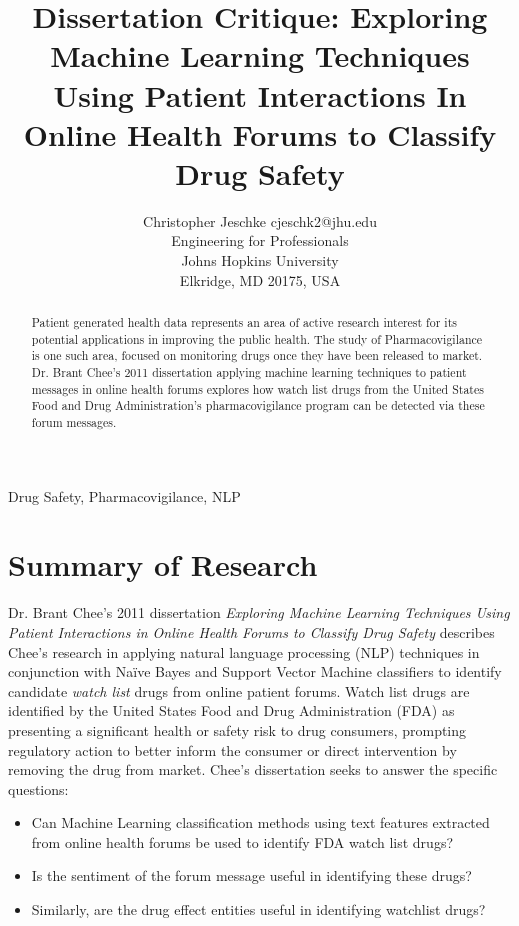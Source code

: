 \documentclass[twoside,11pt]{article}
\begin{document}
\title{Dissertation Critique: Exploring Machine Learning Techniques Using Patient
      Interactions In Online Health Forums to Classify Drug Safety}

\author{\name Christopher Jeschke \email cjeschk2@jhu.edu \\
       \addr Engineering for Professionals\\
       Johns Hopkins University\\
       Elkridge, MD 20175, USA}


\maketitle


\singlespacing

\begin{abstract}%
  Patient generated health data represents an area of active research interest
  for its potential applications in improving the public health. The study of
  Pharmacovigilance is one such area, focused on monitoring drugs once they have been released to market. Dr. Brant Chee's 2011 dissertation applying machine learning techniques to patient messages in online health forums explores how watch list drugs from the United States Food and Drug Administration's pharmacovigilance program can be detected via these forum messages.
\end{abstract}

\begin{keywords}
  Drug Safety, Pharmacovigilance, NLP
\end{keywords}

\section{Summary of Research}
Dr. Brant Chee's 2011 dissertation \textit{Exploring Machine Learning Techniques Using
Patient Interactions in Online Health Forums to Classify Drug Safety} describes
Chee's research in applying natural language processing (NLP) techniques in conjunction with Na\"ive Bayes and Support Vector Machine classifiers to identify candidate \textit{watch list} drugs from online patient forums. Watch list drugs are identified by the United States Food and Drug Administration (FDA) as presenting a significant health or safety risk to drug consumers, prompting regulatory action to better inform the consumer or direct intervention by removing the drug from market. Chee's dissertation seeks to answer the specific questions:
\begin{itemize}
  \item Can Machine Learning classification methods using text features extracted from online health forums be used to identify FDA watch list drugs?
  \item Is the sentiment of the forum message useful in identifying these drugs?
  \item Similarly, are the drug effect entities useful in identifying watchlist drugs?
\end{itemize}
\end{document}
